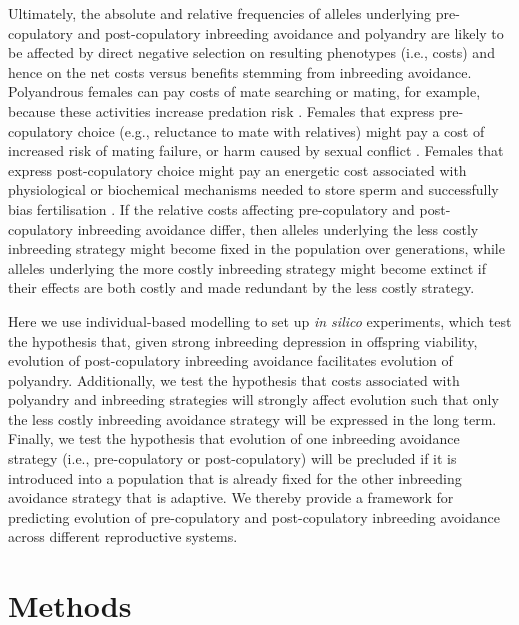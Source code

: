 \documentclass[10pt,letterpaper]{article}
\begin{document}
Ultimately, the absolute and relative frequencies of alleles underlying pre-copulatory and post-copulatory inbreeding avoidance and polyandry are likely to be affected by direct negative selection on resulting phenotypes (i.e., costs) and hence on the net costs versus benefits stemming from inbreeding avoidance. Polyandrous females can pay costs of mate searching or mating, for example, because these activities increase predation risk \cite[e.g.,][]{Rowe1988, Ronkainen1994, Koga1998}. Females that express pre-copulatory choice (e.g., reluctance to mate with relatives) might pay a cost of increased risk of mating failure, or harm caused by sexual conflict \cite[][]{Rowe1994, Kokko2013}. Females that express post-copulatory choice might pay an energetic cost associated with physiological or biochemical mechanisms needed to store sperm and successfully bias fertilisation \cite[e.g.,][]{Gasparini2011, Tuni2013, Fitzpatrick2014b}. If the relative costs affecting pre-copulatory and post-copulatory inbreeding avoidance differ, then alleles underlying the less costly inbreeding strategy might become fixed in the population over generations, while alleles underlying the more costly inbreeding strategy might become extinct if their effects are both costly and made redundant by the less costly strategy.

Here we use individual-based modelling to set up \textit{in silico} experiments, which test the hypothesis that, given strong inbreeding depression in offspring viability, evolution of post-copulatory inbreeding avoidance facilitates evolution of polyandry. Additionally, we test the hypothesis that costs associated with polyandry and inbreeding strategies will strongly affect evolution such that only the less costly inbreeding avoidance strategy will be expressed in the long term. Finally, we test the hypothesis that evolution of one inbreeding avoidance strategy (i.e., pre-copulatory or post-copulatory) will be precluded if it is introduced into a population that is already fixed for the other inbreeding avoidance strategy that is adaptive. We thereby provide a framework for predicting evolution of pre-copulatory and post-copulatory inbreeding avoidance across different reproductive systems.


\section*{Methods}
\end{document}
